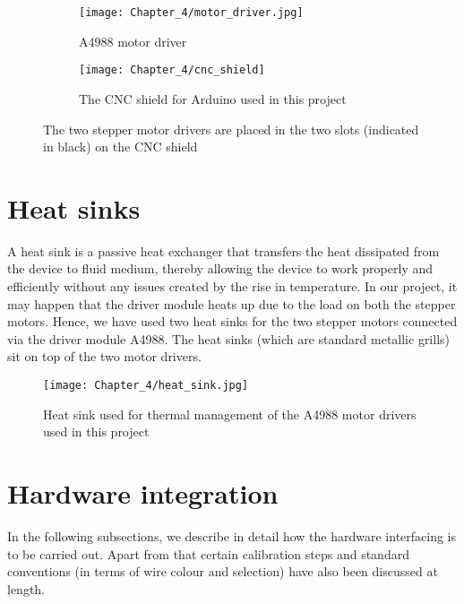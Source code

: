 \begin{figure}[h]

 \begin{subfigure}{0.5\textwidth}
  \texttt{[image: Chapter\_4/motor\_driver.jpg]}
  \caption{A4988 motor driver}
  \label{fig:motor_driver}
 \end{subfigure}
 \begin{subfigure}{0.5\textwidth}
  \hspace{8mm}
  \texttt{[image: Chapter\_4/cnc\_shield]}
  \caption{The CNC shield for Arduino used in this project}
  \label{fig:shield}
 \end{subfigure}

 \caption{The two stepper motor drivers are placed in the two slots (indicated in black) on the CNC shield}
 \label{fig:driver_and_shield}
\end{figure}


\section{Heat sinks}

A heat sink is a passive heat exchanger that transfers the heat dissipated from the device to fluid medium, thereby allowing the device to work properly and efficiently without any issues created by the rise in temperature. In our project, it may happen that the driver module heats up due to the load on both the stepper motors. Hence, we have used two heat sinks for the two stepper motors connected via the driver module A4988. The heat sinks (which are standard metallic grills) sit on top of the two motor drivers.

\begin{figure}[h]
 \centering
 \texttt{[image: Chapter\_4/heat\_sink.jpg]}
 \caption{Heat sink used for thermal management of the A4988 motor drivers used in this project}
 \label{fig:sink}
\end{figure}


\section{Hardware integration}

In the following subsections, we describe in detail how the hardware interfacing is to be carried out. Apart from that certain calibration steps and standard conventions (in terms of wire colour and selection) have also been discussed at length.

